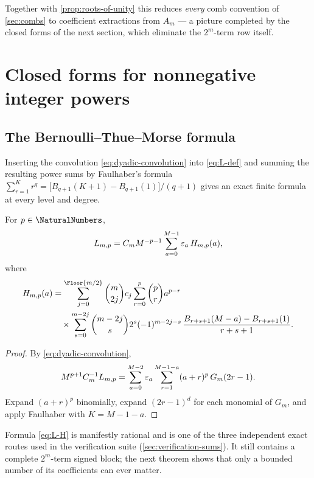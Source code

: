 Together with \cref{prop:roots-of-unity} this reduces \emph{every}
comb convention of \cref{sec:combs} to coefficient extractions from
$A_m$ --- a picture completed by the closed forms of the next section,
which eliminate the $2^{m}$-term row itself.

\section{Closed forms for nonnegative integer powers}
\label{sec:integer}

\subsection{The Bernoulli--Thue--Morse formula}

Inserting the convolution \eqref{eq:dyadic-convolution} into
\eqref{eq:L-def} and summing the resulting power sums by Faulhaber's
formula
$\sum_{r=1}^{K}r^{q}=\bigl[B_{q+1}(K+1)-B_{q+1}(1)\bigr]/(q+1)$
gives an exact finite formula at every level and degree.

\begin{theorem}
\label{thm:bernoulli-TM}
For $p\in\NaturalNumbers$,
\begin{equation}
 L_{m,p}=C_mM^{-p-1}
 \sum_{a=0}^{M-1}\varepsilon_a\,H_{m,p}(a),
 \label{eq:L-H}
\end{equation}
where
\begin{equation}
 \begin{aligned}
 H_{m,p}(a)
 &=\sum_{j=0}^{\Floor{m/2}}\binom m{2j}c_j
   \sum_{r=0}^{p}\binom pr a^{p-r} \\
 &\quad\times
    \sum_{s=0}^{m-2j}\binom{m-2j}{s}2^{s}(-1)^{m-2j-s}\,
    \frac{B_{r+s+1}(M-a)-B_{r+s+1}(1)}{r+s+1}.
  \end{aligned}
 \label{eq:Hnp}
\end{equation}
\end{theorem}

\begin{proof}
By \eqref{eq:dyadic-convolution},
\[
 M^{p+1}C_m^{-1}L_{m,p}
 =\sum_{a=0}^{M-2}\varepsilon_a
 \sum_{r=1}^{M-1-a}(a+r)^{p}\,G_m(2r-1).
\]
Expand $(a+r)^p$ binomially, expand $(2r-1)^{d}$ for each monomial of
$G_m$, and apply Faulhaber with $K=M-1-a$.
\end{proof}

Formula \eqref{eq:L-H} is manifestly rational and is one of the three
independent exact routes used in the verification suite
(\cref{sec:verification-sums}).  It still contains a complete
$2^{m}$-term signed block; the next theorem shows that only a bounded
number of its coefficients can ever matter.

